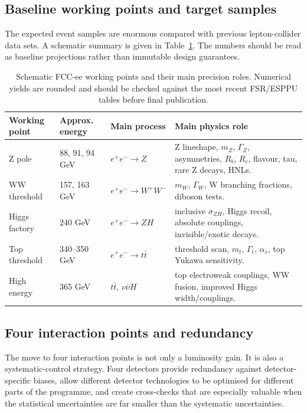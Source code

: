 \documentclass[11pt,a4paper]{article}
\newcommand{\mZ}{m_Z}
\newcommand{\gZ}{\Gamma_Z}
\newcommand{\mW}{m_W}
\newcommand{\gW}{\Gamma_W}
\newcommand{\mt}{m_t}
\newcommand{\Gt}{\Gamma_t}
\newcommand{\als}{\alpha_s}
\numberwithin{equation}{section}
\begin{document}
\subsection{Baseline working points and target samples}
The expected event samples are enormous compared with previous lepton-collider data sets. A schematic summary is given in Table~\ref{tab:run-plan}. The numbers should be read as baseline projections rather than immutable design guarantees.
\begin{table}[H]
\centering
\caption{Schematic FCC-ee working points and their main precision roles. Numerical yields are rounded and should be checked against the most recent FSR/ESPPU tables before final publication.}
\label{tab:run-plan}
\begin{tabularx}{\textwidth}{@{}p{2.7cm}p{2.5cm}p{3cm}X@{}}
\toprule
Working point & Approx. energy & Main process & Main physics role \\
\midrule
Z pole & 88, 91, 94 GeV & \(e^+e^-\to Z\) & Z lineshape, \(\mZ\), \(\gZ\), asymmetries, \(R_b\), \(R_c\), flavour, tau, rare Z decays, HNLs.\\
WW threshold & 157, 163 GeV & \(e^+e^-\to W^+W^-\) & \(\mW\), \(\gW\), W branching fractions, diboson tests.\\
Higgs factory & 240 GeV & \(e^+e^-\to ZH\) & inclusive \(\sigma_{ZH}\), Higgs recoil, absolute couplings, invisible/exotic decays.\\
Top threshold & 340--350 GeV & \(e^+e^-\to t\bar t\) & threshold scan, \(\mt\), \(\Gt\), \(\als\), top Yukawa sensitivity.\\
High energy & 365 GeV & \(t\bar t\), \(\nu\bar\nu H\) & top electroweak couplings, WW fusion, improved Higgs width/couplings.\\
\bottomrule
\end{tabularx}
\end{table}

\subsection{Four interaction points and redundancy}
The move to four interaction points is not only a luminosity gain. It is also a systematic-control strategy. Four detectors provide redundancy against detector-specific biases, allow different detector technologies to be optimised for different parts of the programme, and create cross-checks that are especially valuable when the statistical uncertainties are far smaller than the systematic uncertainties.
\end{document}
